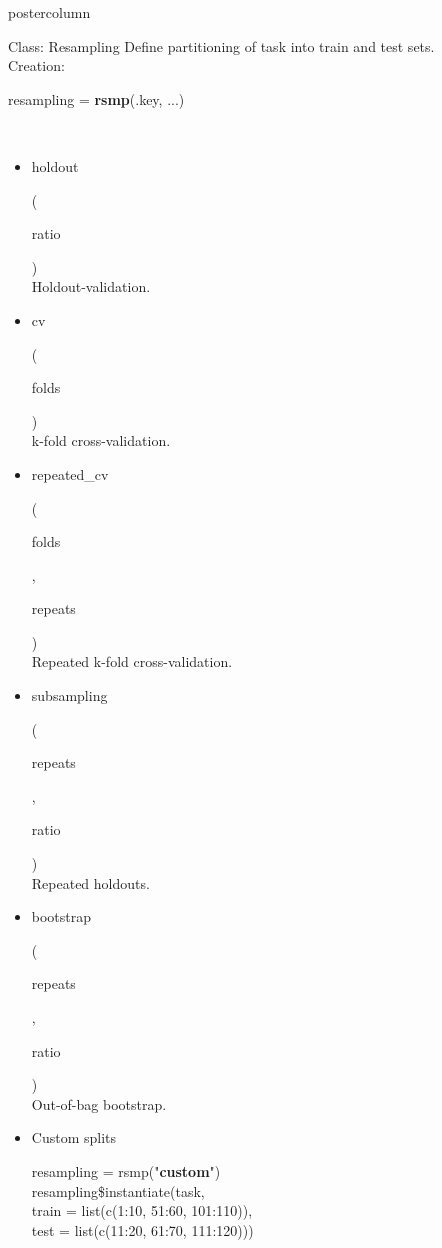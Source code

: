 \documentclass{beamer}
\newlength{\columnheight} %
\newcommand{\codeinline}[1]{\begin{codeboxinline}#1\end{codeboxinline}}
\begin{document}
\begin{withoutheader}
	\begin{frame}[fragile]{}
		\begin{columns}
			\begin{column}{.245\textwidth}
				\begin{beamercolorbox}[center]{postercolumn}
					\begin{minipage}{.98\textwidth}
						\parbox[t][\columnheight]{\textwidth}{
							\begin{myblock}{Class: Resampling}
								Define partitioning of task into train and test sets.\\
								Creation: \codeinline{resampling = \textbf{rsmp}(.key, ...)}
								\\
								\begin{itemize}
									\item \codeinline{holdout}
									      (\codeinline{ratio})\\
									      Holdout-validation.
									\item \codeinline{cv}
									      (\codeinline{folds})\\
									      k-fold cross-validation.
									\item \codeinline{repeated\_cv}
									      (\codeinline{folds}, \codeinline{repeats})\\
									      Repeated k-fold cross-validation.
									\item \codeinline{subsampling}
									      (\codeinline{repeats}, \codeinline{ratio})\\
									      Repeated holdouts.
									\item \codeinline{bootstrap}
									      (\codeinline{repeats}, \codeinline{ratio})\\
									      Out-of-bag bootstrap.
									\item Custom splits \\
									      \begin{codeboxmultiline}[width=26cm]
										      resampling = rsmp("\textbf{custom}")\\
										      resampling\$instantiate(task,\\
										      \hspace*{1ex} train = list(c(1:10, 51:60, 101:110)),\\
										      \hspace*{1ex} test = list(c(11:20, 61:70, 111:120)))
									      \end{codeboxmultiline}

\end{itemize}
\end{myblock}}
\end{minipage}
\end{beamercolorbox}
\end{column}
\end{columns}
\end{frame}
\end{withoutheader}
\end{document}
